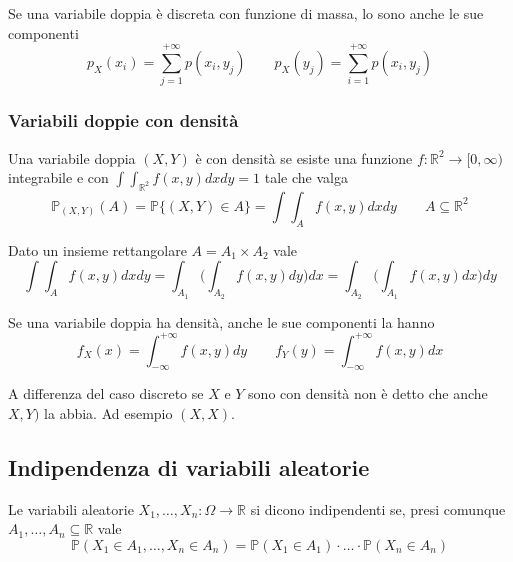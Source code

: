 \begin{proposition}
	Se una variabile doppia è discreta con funzione di massa, lo sono anche le sue componenti
	\begin{equation}
		p_X(x_i) = \sum_{j=1}^{+\infty} p(x_i,y_j) \quad\quad p_X(y_j) = \sum_{i=1}^{+\infty} p(x_i,y_j)
	\end{equation}
\end{proposition}
\subsubsection{Variabili doppie con densità}
Una variabile doppia $(X,Y)$ è con densità se esiste una funzione $f : \mathbb{R}^2 \to [0,\infty)$ integrabile e con $\int\int_{\mathbb{R}^2}f(x,y)dxdy=1$ tale che valga
\begin{equation}
	\mathbb{P}_{(X,Y)}(A) = \mathbb{P}\{(X,Y) \in A\} = \int\int_A f(x,y) dxdy \quad\quad A \subseteq \mathbb{R}^2
\end{equation}

\begin{theorem}
	Dato un insieme rettangolare $A = A_1 \times A_2$ vale
	\begin{equation}
		\int\int_A f(x,y)dxdy = \int_{A_1} \bigg(\int_{A_2} f(x,y)dy\bigg)dx =  \int_{A_2} \bigg(\int_{A_1} f(x,y)dx\bigg)dy 
	\end{equation}
\end{theorem}

\begin{proposition}
	Se una variabile doppia ha densità, anche le sue componenti la hanno
	\begin{equation}
		f_X(x) = \int_{-\infty}^{+\infty}f(x,y)dy \quad\quad f_Y(y) = \int_{-\infty}^{+\infty}f(x,y)dx
	\end{equation}
\end{proposition}

\begin{observation}
	A differenza del caso discreto se $X$ e $Y$ sono con densità non è detto che anche $X,Y)$ la abbia. Ad esempio $(X,X)$.
\end{observation}

\subsection{Indipendenza di variabili aleatorie}
\begin{definition}
	Le variabili aleatorie $X_1, \ldots, X_n:\Omega \to \mathbb{R}$ si dicono indipendenti se, presi comunque $A_1, \ldots, A_n \subseteq \mathbb{R}$ vale
	\begin{equation}
		\mathbb{P}(X_1 \in A_1, \ldots, X_n \in A_n) = \mathbb{P}(X_1 \in A_1) \cdot \ldots \cdot \mathbb{P}(X_n \in A_n)
	\end{equation} 
\end{definition}

